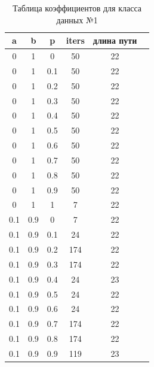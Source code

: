 \documentclass[a4paper,12pt]{article}
\begin{document}
	    	\begin{table}
	    		\caption{Таблица коэффициентов для класса данных №1}
	    	\begin{minipage}[h!]{0.10\hsize}\centering
	    		\begin{center}
	    			\begin{tabular}{c@{\hspace{7mm}}c@{\hspace{7mm}}c@{\hspace{7mm}}c@{\hspace{7mm}}c@{\hspace{7mm}}c}
	    				
	    				\toprule
	    				a        &b      &p      &iters &длина пути \\
	    				\midrule
	    				0       &1      &0      &50    &22\\
	    				0       &1      &0.1    &50    &22\\
	    				0       &1      &0.2    &50    &22\\
	    				0       &1      &0.3    &50    &22\\
	    				0       &1      &0.4    &50    &22\\
	    				0       &1      &0.5    &50    &22\\
	    				0       &1      &0.6    &50    &22\\
	    				0       &1      &0.7    &50    &22\\
	    				0       &1      &0.8    &50    &22\\
	    				0       &1      &0.9    &50    &22\\
	    				0       &1      &1      &7     &22\\
	    				\midrule
	    				0.1     &0.9    &0      &7     &22\\
	    				0.1     &0.9    &0.1    &24    &22\\
	    				0.1     &0.9    &0.2    &174   &22\\
	    				0.1     &0.9    &0.3    &174   &22\\
	    				0.1     &0.9    &0.4    &24    &23\\
	    				0.1     &0.9    &0.5    &24    &22\\
	    				0.1     &0.9    &0.6    &24    &22\\
	    				0.1     &0.9    &0.7    &174   &22\\
	    				0.1     &0.9    &0.8    &174   &22\\
	    				0.1     &0.9    &0.9    &119   &23\\

\end{tabular}
\end{center}
\end{minipage}
\end{table}
\end{document}
